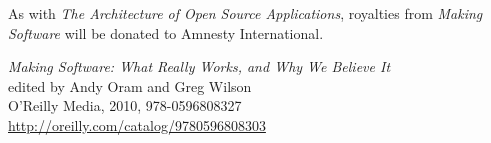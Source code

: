 \vspace{-0.2cm}

\setlength{\parskip}{0.15cm}

\noindent As with \emph{The Architecture of Open Source Applications}, royalties
from \emph{Making Software} will be donated to Amnesty International.

\noindent \emph{Making Software: What Really Works, and Why We Believe It} \\
edited by Andy Oram and Greg Wilson \\
O'Reilly Media, 2010, 978-0596808327 \\
\url{http://oreilly.com/catalog/9780596808303}

\normalfont

\pagebreak
\thispagestyle{empty}

